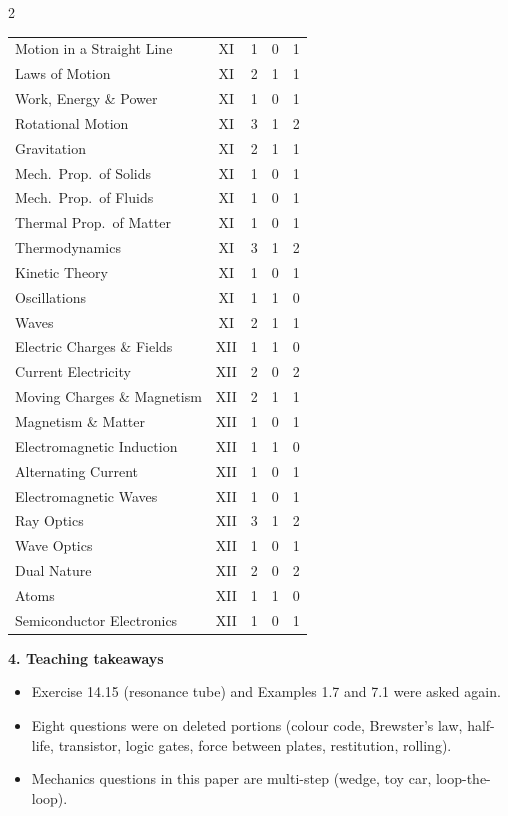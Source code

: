 \begin{multicols}{2}
{\begin{tabular}{@{}p{4.7cm}c@{\,}r@{\,}r@{\,}r@{}}
Motion in a Straight Line & XI & 1 & 0 & 1\\
Laws of Motion & XI & 2 & 1 & 1\\
Work, Energy \& Power & XI & 1 & 0 & 1\\
Rotational Motion & XI & 3 & 1 & 2\\
Gravitation & XI & 2 & 1 & 1\\
Mech.\ Prop.\ of Solids & XI & 1 & 0 & 1\\
Mech.\ Prop.\ of Fluids & XI & 1 & 0 & 1\\
Thermal Prop.\ of Matter & XI & 1 & 0 & 1\\
Thermodynamics & XI & 3 & 1 & 2\\
Kinetic Theory & XI & 1 & 0 & 1\\
Oscillations & XI & 1 & 1 & 0\\
Waves & XI & 2 & 1 & 1\\
Electric Charges \& Fields & XII & 1 & 1 & 0\\
Current Electricity & XII & 2 & 0 & 2\\
Moving Charges \& Magnetism & XII & 2 & 1 & 1\\
Magnetism \& Matter & XII & 1 & 0 & 1\\
Electromagnetic Induction & XII & 1 & 1 & 0\\
Alternating Current & XII & 1 & 0 & 1\\
Electromagnetic Waves & XII & 1 & 0 & 1\\
Ray Optics & XII & 3 & 1 & 2\\
Wave Optics & XII & 1 & 0 & 1\\
Dual Nature & XII & 2 & 0 & 2\\
Atoms & XII & 1 & 1 & 0\\
Semiconductor Electronics & XII & 1 & 0 & 1\\
\bottomrule\end{tabular}}\par\medskip
\textbf{\color{crimson}4. Teaching takeaways}\par\smallskip
{\footnotesize\begin{itemize}[leftmargin=1em,nosep]
\item Exercise 14.15 (resonance tube) and Examples 1.7 and 7.1 were asked again.
\item Eight questions were on deleted portions (colour code, Brewster's law, half-life, transistor, logic gates, force between plates, restitution, rolling).
\item Mechanics questions in this paper are multi-step (wedge, toy car, loop-the-loop).

\end{itemize}}
\end{multicols}
